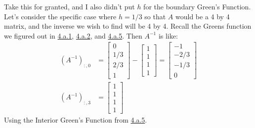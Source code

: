 \documentclass[]{article}
\begin{document}
        Take this for granted, and I also didn't put $h$ for the boundary Green's Function. Let's consider the specific case where $h = 1/3$ so that $A$ would be a 4 by 4 matrix, and the inverse we wish to find will be 4 by 4. Recall the Greens function we figured out in \hyperref[eqn:4.a.1]{4.a.1}, \hyperref[eqn:4.a.2]{4.a.2}, and \hyperref[eqn:4.a.5]{4.a.5}. Then $A^{-1}$ is like: 
        \begin{align*}\tag{4.b.3}\label{eqn:4.b.3}
            (A^{-1})_{:, 0} &= \begin{bmatrix}
                0 \\1/3 \\2/3\\ 1
            \end{bmatrix}
            - \begin{bmatrix}
                1 \\1 \\1\\ 1 
            \end{bmatrix}
            = 
            \begin{bmatrix}
                -1\\ -2/3\\ -1/3\\ 0
            \end{bmatrix}
            \\
            (A^{-1})_{:, 3} &= 
            \begin{bmatrix}
                1 \\ 1 \\ 1 \\ 1
            \end{bmatrix}
        \end{align*}
        Using the Interior Green's Function from \hyperref[eqn:4.a.5]{4.a.5}. 
\end{document}
